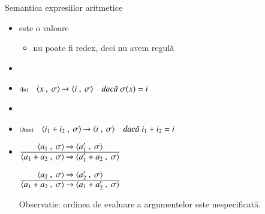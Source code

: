 \documentclass[xcolor=pdftex,romanian,colorlinks]{beamer}
\begin{document}
  
\begin{frame}[fragile]{Semantica expresiilor aritmetice}
  \begin{itemize}
    \item {} este o valoare 
  \begin{itemize}
 	\item  nu poate fi redex, deci nu avem regulă
  \end{itemize}
    \smallskip
     \item {}
  	\item[] $\reg[Id]{\Ss{\Conf{x}{\sigma}}{\Conf{i}{\sigma}}}{}{\sigma(x) = i}$

    \smallskip
  \item {}	
  \smallskip
    \item[] $\reg[Add]{\Ss{\Conf{i_1 + i_2}{\sigma}}{\Conf{i}{\sigma}}}{}{i_1 + i_2 = i}$
    \medskip  
  \item[] $\reg{\Ss{\Conf{a_1 + a_2}{\sigma}}{\Conf{a_1' + a_2}{\sigma}}}{\Ss{\Conf{a_1}{\sigma}}{\Conf{a_1'}{\sigma}}}{}$
  
  \vspace{.2cm}
  $\reg{\Ss{\Conf{a_1 + a_2}{\sigma}}{\Conf{a_1 + a_2'}{\sigma}}}{\Ss{\Conf{a_2}{\sigma}}{\Conf{a_2'}{\sigma}}}{}$
  
  \vspace{.2cm}
  Observatie: ordinea de  evaluare a argumentelor este nespecificată.
  \end{itemize}
  

\end{frame}
\end{document}
